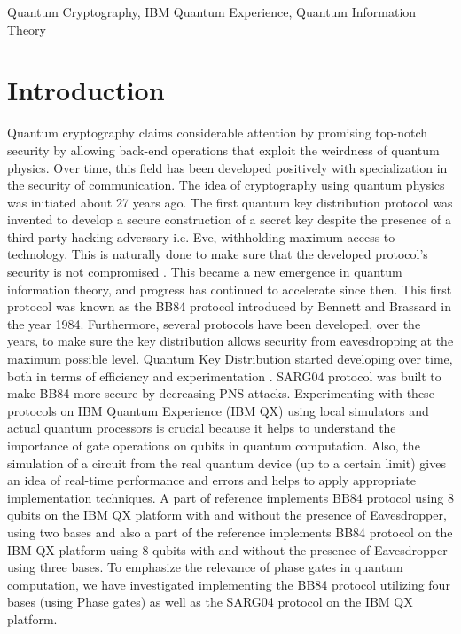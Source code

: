 \documentclass[superscriptaddress,twocolumn,showpacs,prb,floatfix]{revtex4}
\begin{document}
\begin{keywords}{Quantum Cryptography, IBM Quantum Experience, Quantum Information Theory}\end{keywords}
\maketitle
\section{Introduction}
\label{SecI}
Quantum cryptography claims considerable attention by promising top-notch security by allowing back-end operations that exploit the weirdness of quantum physics\cite{RQC2011Science2011}. Over time, this field has been developed positively with specialization in the security of communication. The idea of cryptography using quantum physics was initiated about 27 years ago. The first quantum key distribution protocol was invented to develop a secure construction of a secret key despite the presence of a third-party hacking adversary i.e. Eve, withholding maximum access to technology. This is naturally done to make sure that the developed protocol's security is not compromised \cite{qkd_PathakCRC2018}. This became a new emergence in quantum information theory, and progress has continued to accelerate since then. This first protocol was known as the BB84 protocol \cite{BBQCIEEE1984, BCBTCS2014} introduced by Bennett and Brassard in the year 1984. Furthermore, several protocols have been developed, over the years, to make sure the key distribution allows security from eavesdropping at the maximum possible level. Quantum Key Distribution started developing over time, both in terms of efficiency and experimentation \cite{HFPR2014, BFO2017, AFPRA2012, CHBJoC1992, MMNP2019, DAMIEEE2013}. SARG04 protocol was built to make BB84 more secure by decreasing PNS attacks. Experimenting with these protocols on IBM Quantum Experience (IBM QX) using local simulators and actual quantum processors is crucial because it helps to understand the importance of gate operations on qubits in quantum computation. Also, the simulation of a circuit from the real quantum device (up to a certain limit) gives an idea of real-time performance and errors and helps to apply appropriate implementation techniques. A part of reference \cite{DAMIEEE2013} implements BB84 protocol using 8 qubits on the IBM QX platform with and without the presence of Eavesdropper, using two bases and also a part of the reference \cite{ERQKD2020} implements BB84 protocol on the IBM QX platform using 8 qubits with and without the presence of Eavesdropper using three bases. To emphasize the relevance of phase gates in quantum computation, we have investigated implementing the BB84 protocol utilizing four bases (using Phase gates) as well as the SARG04 protocol on the IBM QX platform.
\end{document}
